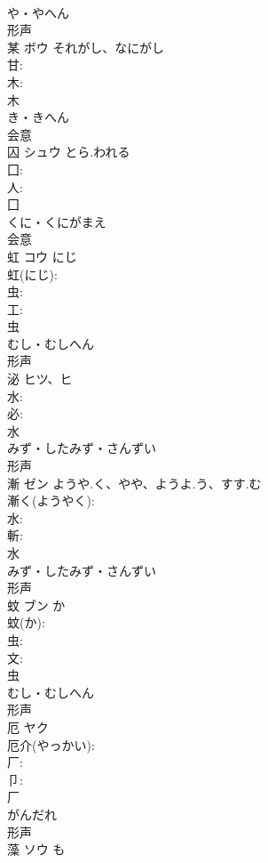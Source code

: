 \documentclass[8pt]{extreport}
\begin{document}
\begin{CJK}{UTF8}{min}
\\	や・やへん	
\\	形声 
\\	某	ボウ	それがし、なにがし		
\\	甘: 
\\	木: 
\\	木	
\\	き・きへん	
\\	会意 
\\	囚	シュウ	とら.われる		
\\	囗: 
\\	人: 
\\	囗	
\\	くに・くにがまえ	
\\	会意 
\\	虹	コウ	にじ		
\\	虹(にじ): 
\\	虫: 
\\	工: 
\\	虫	
\\	むし・むしへん	
\\	形声 
\\	泌	ヒツ、ヒ			
\\	水: 
\\	必: 
\\	水	
\\	みず・したみず・さんずい	
\\	形声 
\\	漸	ゼン	ようや.く、やや、ようよ.う、すす.む		
\\	漸く(ようやく): 
\\	水: 
\\	斬: 
\\	水	
\\	みず・したみず・さんずい	
\\	形声 
\\	蚊	ブン	か		
\\	蚊(か): 
\\	虫: 
\\	文: 
\\	虫	
\\	むし・むしへん	
\\	形声 
\\	厄	ヤク			
\\	厄介(やっかい): 
\\	厂: 
\\	卩: 
\\	厂	
\\	がんだれ	
\\	形声 
\\	藻	ソウ	も		

\end{CJK}
\end{document}
